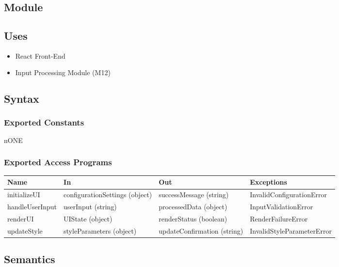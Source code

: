 \documentclass[12pt, titlepage]{article}
\begin{document}
\subsection{Module}

\subsection{Uses}

\begin{itemize}
  \item React Front-End
  \item Input Processing Module (M12)
\end{itemize}

\subsection{Syntax}

\subsubsection{Exported Constants}

nONE

\subsubsection{Exported Access Programs}

\begin{center}
\begin{tabular}{p{2cm} p{4cm} p{4cm} p{2cm}}
\hline
\textbf{Name} & \textbf{In} & \textbf{Out} & \textbf{Exceptions} \\
\hline
initializeUI & configurationSettings (object) & successMessage (string) & InvalidConfigurationError \\
\hline
handleUserInput & userInput (string) & processedData (object) & InputValidationError \\
\hline
renderUI & UIState (object) & renderStatus (boolean) & RenderFailureError \\
\hline
updateStyle & styleParameters (object) & updateConfirmation (string) & InvalidStyleParameterError \\
\hline
\end{tabular}
\end{center}

\subsection{Semantics}
\end{document}
